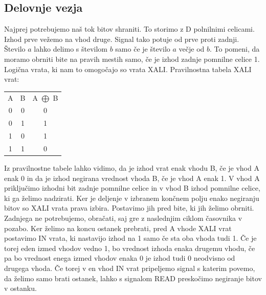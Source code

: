 \documentclass[12pt]{article}
\begin{document}
    \subsection{Delovnje vezja}
        Najprej potrebujemo naš tok bitov shraniti. To storimo z D polnilnimi
        celicami. Izhod prve vežemo na vhod druge. Signal tako potuje od prve 
        proti zadnji. Število $a$ lahko delimo s številom $b$ samo če je število
        $a$ večje od $b$. To pomeni, da moramo obrniti bite na pravih mestih
        samo, če je izhod zadnje pomnilne celice 1. Logična vrata, ki nam to 
        omogočajo so vrata XALI. Pravilnostna tabela XALI vrat:
        \begin{table}[!h]
            \centering
            \begin{tabular}{c|c||c}
                A & B & A $\bigoplus$ B\\
                \cline{1-3}
                0 & 0 & 0\\
                0 & 1 & 1\\
                1 & 0 & 1\\
                1 & 1 & 0\\
            \end{tabular}
        \end{table}
        Iz pravilnostne tabele lahko vidimo, da je izhod vrat enak vhodu B, če 
        je vhod A enak 0 in da je izhod negirana vrednost vhoda B, če je vhod A 
        enak 1. V vhod A priključimo izhodni bit zadnje pomnilne celice in v 
        vhod B izhod pomnilne celice, ki ga želimo nadzirati. Ker je deljenje v
        izbranem končnem polju enako negiranju bitov so XALI vrata prava izbira.
        Postavimo jih pred bite, ki jih želimo obrniti. Zadnjega ne potrebujemo,
        obračati, saj gre z naslednjim ciklom časovnika v pozabo. 
        Ker želimo na koncu ostanek prebrati, pred A vhode XALI vrat postavimo
        IN vrata, ki nastavijo izhod na 1 samo če sta oba vhoda tudi 1. Če je 
        torej eden izmed vhodov vedno 1, bo vrednost izhoda enaka drugemu vhodu,
        če pa bo vrednost enega izmed vhodov enaka 0 je izhod tudi 0 neodvisno 
        od drugega vhoda. Če torej v en vhod IN vrat pripeljemo signal s katerim
        povemo, da želimo samo brati ostanek, lahko s signalom READ preskočimo
        negiranje bitov v ostanku. 

    \newpage
\end{document}

